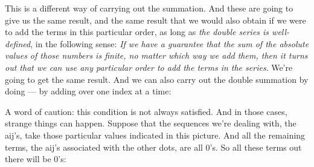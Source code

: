 \documentclass[pdftex, brazil, 12pt, twoside]{article}
\begin{document}
This is a different way of carrying out the summation.
And these are going to give us the same result, and the same
result that we would also obtain if we were to add the
terms in this particular order, as long as \emph{the double
series is well-defined}, in the following sense:
\emph{If we have a guarantee that the sum of the absolute values
of those numbers is finite, no matter which way we add them,
then it turns out that we can use any particular order to
add the terms in the series}.
We're going to get the same result.
And we can also carry out the double summation by doing ---
by adding over one index at a time:

\begin{figure}[H]
  \begin{center}
  \end{center}
\end{figure}

A word of caution:
this condition is not always satisfied.
And in those cases, strange things can happen.
Suppose that the sequences we're dealing with, the aij's,
take those particular values indicated in this picture.
And all the remaining terms, the aij's associated with the
other dots, are all 0's.
So all these terms out there will be 0's:

\begin{figure}[H]
  \begin{center}
  \end{center}
\end{figure}
\end{document}
